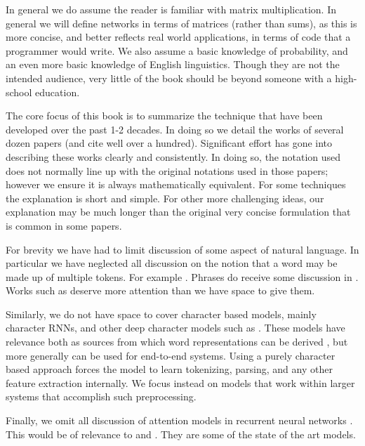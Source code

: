 \documentclass[12pt,parskip]{komatufte}
\begin{document}
In general we do assume the reader is familiar with matrix multiplication.
In general we will define networks in terms of matrices (rather than sums),
as this is more concise, and better reflects real world applications,
in terms of code that a programmer would write.
We also assume a basic knowledge of probability, and an even more basic knowledge of English linguistics.
Though they are not the intended audience, very little of the book should be beyond someone with a high-school education.



The core focus of this book is to summarize the technique that have been developed over the past 1-2 decades.
In doing so we detail the works of several dozen papers (and cite well over a hundred).
Significant effort has gone into describing these works clearly and consistently.
In doing so, the notation used does not normally line up with the original notations used in those papers; however we ensure it is always mathematically equivalent.
For some techniques the explanation is short and simple.
For other more challenging ideas, our explanation may be much longer than the original very concise formulation that is common in some papers.



For brevity we have had to limit discussion of some aspect of natural language.
In particular we have neglected all discussion on the notion that a word may be made up of multiple tokens.
For example .
Phrases do receive some discussion in .
Works such as  deserve more attention than we have space to give them.

Similarly, we do not have space to cover character based models,
mainly character RNNs, and other deep character models such as .
These models have relevance both as sources from which word representations can be derived ,
but more generally can be used for end-to-end systems.
Using a purely character based approach forces the model to learn tokenizing, parsing, and any other feature extraction internally.
We focus instead on models that work within larger systems that accomplish such preprocessing.

Finally, we omit all discussion of attention models in recurrent neural networks .
This would be of relevance to  and .
They are some of the state of the art models.
\end{document}
